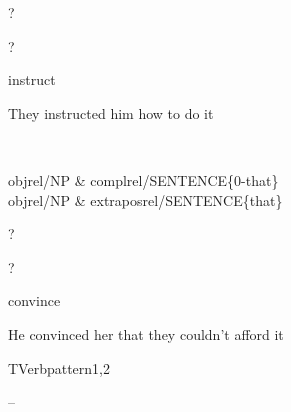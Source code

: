 
\begin{thetadescr}
\evitem ?
\esitem
     \begin{examples}
        \example  ?
     \end{examples}
\end{thetadescr}



\begin{thetadescr}
\evitem  instruct
\esitem
     \begin{examples}
        \example They instructed him how to do it
     \end{examples}
\end{thetadescr}


\newpage
{}
\begin{vpattern}
 \norule
\csritem \mbox{}\\
     \begin{csr}
       objrel/NP & complrel/SENTENCE\{0-that\} \\
       objrel/NP & extraposrel/SENTENCE\{that\} 
     \end{csr}
\remarksitem
\end{vpattern}


\begin{thetadescr}
\evitem ?
\esitem
     \begin{examples}
        \example  ?
     \end{examples}
\end{thetadescr}



\begin{thetadescr}
\evitem  convince
\esitem
     \begin{examples}
        \example He convinced her that they couldn't afford it
     \end{examples}
\end{thetadescr}


\newpage
\verbpattern{[synEMPTY] }
\begin{vpattern}
 TVerbpattern1,2   
\csritem \mbox{}\\
     \begin{csr}
     -- 
     \end{csr}
\remarksitem
\end{vpattern}


